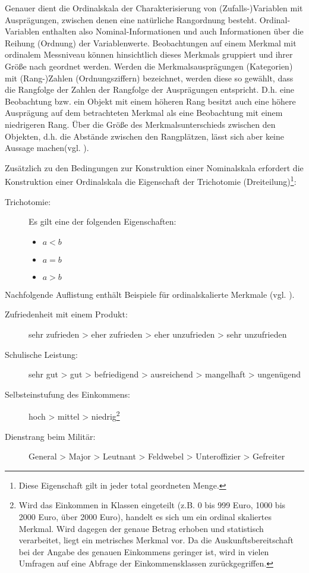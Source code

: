 Genauer dient die Ordinalskala der Charakterisierung von (Zufalls-)Variablen mit Ausprägungen,
zwischen denen eine natürliche Rangordnung besteht.
Ordinal-Variablen enthalten also Nominal-Informationen und auch Informationen über die Reihung (Ordnung) der Variablenwerte. 
Beobachtungen auf einem Merkmal mit ordinalem Messniveau können hinsichtlich dieses Merkmals gruppiert und ihrer Größe nach geordnet werden.
Werden die Merkmalsausprägungen (Kategorien) mit (Rang-)Zahlen (Ordnungsziffern) bezeichnet, werden diese so gewählt, 
dass die Rangfolge der Zahlen der Rangfolge der Ausprägungen entspricht. D.h. eine Beobachtung bzw. ein Objekt mit einem höheren Rang besitzt 
auch eine höhere Ausprägung auf dem betrachteten Merkmal als eine Beobachtung mit einem niedrigeren Rang. 
Über die Größe des Merkmalsunterschieds zwischen den Objekten, d.h. die Abstände zwischen den Rangplätzen, lässt sich aber keine Aussage machen(vgl.
).


Zusätzlich zu den Bedingungen zur Konstruktion einer Nominalskala erfordert die Konstruktion einer Ordinalskala die Eigenschaft der Trichotomie (Dreiteilung)\footnote{Diese Eigenschaft gilt in jeder total geordneten Menge.}:
\begin{description}
	\item[Trichotomie:] Es gilt eine der folgenden Eigenschaften:
		\begin{itemize}
		  \item $a < b$
		  \item $a = b$
		  \item $a > b$ 
		\end{itemize} 
\end{description}

Nachfolgende Auflistung enthält Beispiele für ordinalskalierte Merkmale (vgl.
).
\begin{description}
  \item[Zufriedenheit mit einem Produkt:] sehr zufrieden > eher zufrieden > eher unzufrieden > sehr unzufrieden
  \item[Schulische Leistung:] sehr gut > gut > befriedigend > ausreichend > mangelhaft > ungenügend
  \item[Selbsteinstufung des Einkommens:] hoch > mittel > niedrig\footnote{Wird das Einkommen in
  Klassen eingeteilt (z.B. 0 bis 999 Euro, 1000 bis 2000 Euro, über 2000 Euro), 
  handelt es sich um ein ordinal skaliertes Merkmal. Wird dagegen der genaue Betrag erhoben und statistisch verarbeitet, liegt ein metrisches Merkmal vor. 
  Da die Auskunftsbereitschaft bei der Angabe des genauen Einkommens geringer ist, wird in vielen
  Umfragen auf eine Abfrage der Einkommensklassen zurückgegriffen.}
  \item[Dienstrang beim Militär:] General > Major > Leutnant > Feldwebel > Unteroffizier > Gefreiter
\end{description} 





